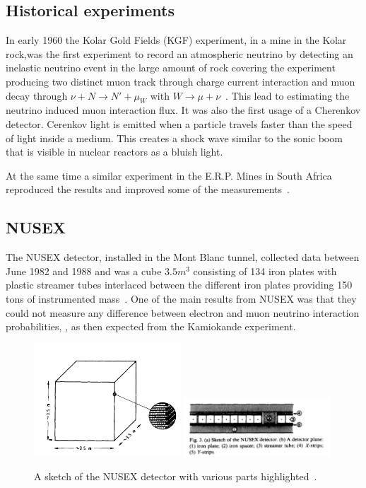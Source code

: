 \subsection{Historical experiments}
In early 1960 the Kolar Gold Fields (KGF) experiment, in a mine in the Kolar rock,was the first experiment to record an atmospheric neutrino by detecting an inelastic neutrino event in the large amount of rock covering the experiment producing two distinct muon track through charge current interaction and muon decay through $\nu + N \rightarrow N' + \mu _ W$ with $W \rightarrow \mu + \nu$~\cite{55Narasimham}. This lead to estimating the neutrino induced muon interaction flux. It was also the first usage of a Cherenkov detector. Cerenkov light is emitted when a particle travels faster than the speed of light inside a medium. This creates a shock wave similar to the sonic boom that is visible in nuclear reactors as a bluish light.

At the same time a similar experiment in the E.R.P. Mines in South Africa reproduced the results and improved some of the measurements~\cite{55Narasimham}.


\subsection{NUSEX}
The NUSEX detector, installed in the Mont Blanc tunnel, collected data between June 1982 and 1988 and was a cube $3.5m^3$ consisting of 134 iron plates with plastic streamer tubes interlaced between the different iron plates providing 150 tons of instrumented mass~. One of the main results from NUSEX was that they could not measure any difference between electron and muon neutrino interaction probabilities, , as then expected from the Kamiokande experiment.

\begin{figure}[h!]
\centering
  \centering
\includegraphics[width=0.49\textwidth]{figures/nusex1.jpeg}
\includegraphics[width=0.49\textwidth]{figures/nusex2.jpeg}
\vspace{2mm}
\caption{A sketch of the NUSEX detector with various parts highlighted~\cite{56NUSEX}.}
\label{fig:nusex}
\end{figure}

